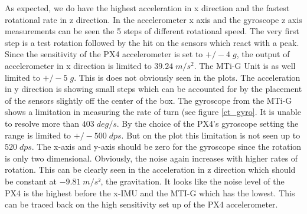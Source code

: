 As expected, we do have the highest acceleration in x direction and the fastest rotational rate in z direction. In the accelerometer x axis and the gyroscope z axis measurements can be seen the 5 steps of different rotational speed. The very first step is a test rotation followed by the hit on the sensors which react with a peak. Since the sensitivity of the PX4 accelerometer is set to $+/- 4 \;g$, the output of accelerometer in x direction is limited to $39.24 \;m/s^2$. The MTi-G Unit is as well limited to $+/- 5\;g$. This is does not obviously seen in the plots. The acceleration in y direction is showing small steps which can be accounted for by the placement of the sensors slightly off the center of the box. The gyroscope from the MTi-G shows a limitation in measuring the rate of turn (see figure \ref{ct_gyro}. It is unable to resolve more than $ 403 \;deg/s$. By the choice of the PX4's gyroscope setting the range is limited to $+/- 500\;dps$. But on the plot this limitation is not seen up to $520\;dps$. The x-axis and y-axis should be zero for the gyroscope since the rotation is only two dimensional. Obviously, the noise again increases with higher rates of rotation. This can be clearly seen in the acceleration in z direction which should be constant at $-9.81 \;m/s²$, the gravitation. It looks like the noise level of the PX4 is the highest before the x-IMU and the MTI-G which has the lowest. This can be traced back on the high sensitivity set up of the PX4 accelerometer.


